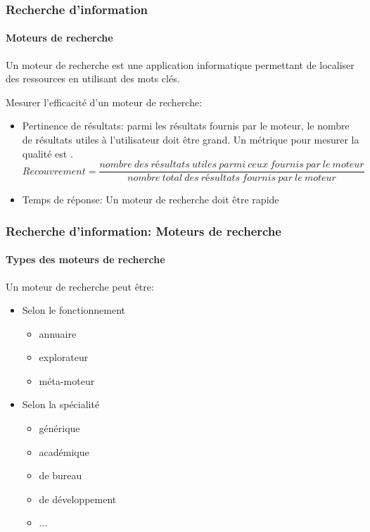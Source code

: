 \documentclass[xcolor=table]{beamer}
\begin{document}
\begin{frame}
\frametitle{Recherche d'information}
\framesubtitle{Moteurs de recherche}

\begin{definition}
	Un moteur de recherche est une application informatique permettant de localiser des ressources en utilisant des mots clés.
\end{definition}

Mesurer l'efficacité d'un moteur de recherche:
\begin{itemize}
	\item Pertinence de résultats: parmi les résultats fournis par le moteur, le nombre de résultats utiles à l'utilisateur doit être grand. Un métrique pour mesurer la qualité est .
	{\scriptsize \[ Recouvrement = \frac{nombre\ des\ résultats\ utiles\ parmi\ ceux\ fournis\ par\ le\ moteur}{nombre\ total\ des\ résultats\ fournis\ par\ le\ moteur} \]}
	\item Temps de réponse: Un moteur de recherche doit être rapide
\end{itemize}

\end{frame}

\begin{frame}
\frametitle{Recherche d'information: Moteurs de recherche}
\framesubtitle{Types des moteurs de recherche}

Un moteur de recherche peut être:
\begin{itemize}
	\item Selon le fonctionnement
	\begin{itemize}
		\item annuaire
		\item explorateur
		\item méta-moteur
	\end{itemize}

	\item Selon la spécialité
	\begin{itemize}
		\item générique
		\item académique
		\item de bureau 
		\item de développement
		\item ...
	\end{itemize}
\end{itemize} 

\end{frame}
\end{document}
